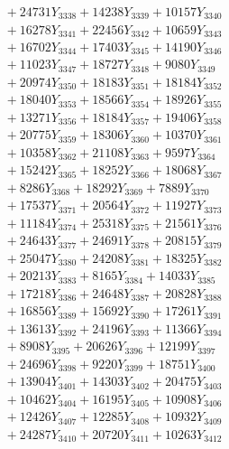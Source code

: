 \documentclass[a4paper,10pt]{article}
\begin{document}
{\begin{align}
&\;  + 24731 Y_{3338} + 14238 Y_{3339} + 10157 Y_{3340} \\[0.3ex]
&\;  + 16278 Y_{3341} + 22456 Y_{3342} + 10659 Y_{3343} \\[0.3ex]
&\;  + 16702 Y_{3344} + 17403 Y_{3345} + 14190 Y_{3346} \\[0.3ex]
&\;  + 11023 Y_{3347} + 18727 Y_{3348} + 9080 Y_{3349} \\[0.3ex]
&\;  + 20974 Y_{3350} + 18183 Y_{3351} + 18184 Y_{3352} \\[0.3ex]
&\;  + 18040 Y_{3353} + 18566 Y_{3354} + 18926 Y_{3355} \\[0.3ex]
&\;  + 13271 Y_{3356} + 18184 Y_{3357} + 19406 Y_{3358} \\[0.5ex]\allowbreak
&\;  + 20775 Y_{3359} + 18306 Y_{3360} + 10370 Y_{3361} \\[0.3ex]
&\;  + 10358 Y_{3362} + 21108 Y_{3363} + 9597 Y_{3364} \\[0.3ex]
&\;  + 15242 Y_{3365} + 18252 Y_{3366} + 18068 Y_{3367} \\[0.3ex]
&\;  + 8286 Y_{3368} + 18292 Y_{3369} + 7889 Y_{3370} \\[0.3ex]
&\;  + 17537 Y_{3371} + 20564 Y_{3372} + 11927 Y_{3373} \\[0.3ex]
&\;  + 11184 Y_{3374} + 25318 Y_{3375} + 21561 Y_{3376} \\[0.3ex]
&\;  + 24643 Y_{3377} + 24691 Y_{3378} + 20815 Y_{3379} \\[0.3ex]
&\;  + 25047 Y_{3380} + 24208 Y_{3381} + 18325 Y_{3382} \\[0.3ex]
&\;  + 20213 Y_{3383} + 8165 Y_{3384} + 14033 Y_{3385} \\[0.3ex]
&\;  + 17218 Y_{3386} + 24648 Y_{3387} + 20828 Y_{3388} \\[0.5ex]\allowbreak
&\;  + 16856 Y_{3389} + 15692 Y_{3390} + 17261 Y_{3391} \\[0.3ex]
&\;  + 13613 Y_{3392} + 24196 Y_{3393} + 11366 Y_{3394} \\[0.3ex]
&\;  + 8908 Y_{3395} + 20626 Y_{3396} + 12199 Y_{3397} \\[0.3ex]
&\;  + 24696 Y_{3398} + 9220 Y_{3399} + 18751 Y_{3400} \\[0.3ex]
&\;  + 13904 Y_{3401} + 14303 Y_{3402} + 20475 Y_{3403} \\[0.3ex]
&\;  + 10462 Y_{3404} + 16195 Y_{3405} + 10908 Y_{3406} \\[0.3ex]
&\;  + 12426 Y_{3407} + 12285 Y_{3408} + 10932 Y_{3409} \\[0.3ex]
&\;  + 24287 Y_{3410} + 20720 Y_{3411} + 10263 Y_{3412} \\[0.3ex]

\end{align}}
\end{document}
